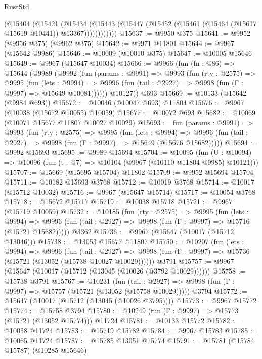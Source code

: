 \begin{lexlean}{RustStd}
\begin{coremodule}
{\begin{coremodule}
{{{{{{{{{{{{{{{{{{{{{{{{{{{{{{{{{{{{{{{{{{{{{{{{{{{{{{{{{{{{{{{{{{{{{{{{{{{{{{              (@15404
                (@15421
                  (@15434
                    (@15443
                      (@15447 (@15452 (@15461 (@15464 (@15617 @15619 @10441)) @13367))))))))))))
@15637 := @9950 @375
@15641 := @9952 (@9956 @375) (@9962 @375)
@15642 := @9971 @11801
@15644 := @9967 (@15642 @9986)
@15646 := @10009 (@10010 @375)
@15647 := @10005 @15646
@15649 := @9967 (@15647 @10034)
@15666 := @9966
    (fun (fn : @86) =>
    @15644
      (@9989
        (@9992
          (fun (params : @9991) =>
          @9993
            (fun (rty : @2575) =>
            @9995
              (fun (lets : @9994) =>
              @9996 (fun (tail : @2927) => @9998 (fun (Γ : @9997) => @15649 @10081))))))
        @10127))
    @693
@15669 := @10133 (@15642 (@9984 @693))
@15672 := @10046 (@10047 @693) @11804
@15676 := @9967 (@10038 (@15672 @10055) @10059)
@15677 := @10072 @693
@15682 := @10069 (@10071 @15677 @11807 @10027 @10029)
@15693 := fun (params : @9991) =>
  @9993
    (fun (rty : @2575) =>
    @9995
      (fun (lets : @9994) =>
      @9996 (fun (tail : @2927) => @9998 (fun (Γ : @9997) => @15649 (@15676 @15682)))))
@15694 := @9992 @15693
@15695 := @9989 @15694
@15704 := @10095
    (fun (U : @10094) => @10096 (fun (t : @7) => @10104 (@9967 (@10110 @11804 @9985) @10121)))
@15707 := @15669 (@15695 @15704) @11802
@15709 := @9952 @15694 @15704
@15711 := @10182 @15693 @3768
@15712 := @10019 @3768
@15714 := @10017 (@15712 @10032)
@15716 := @9967 (@15647 @15714)
@15717 := @10054 @3768
@15718 := @15672 @15717
@15719 := @10038 @15718
@15721 := @9967 (@15719 @10059)
@15732 := @10185
    (fun (rty : @2575) =>
    @9995
      (fun (lets : @9994) =>
      @9996 (fun (tail : @2927) => @9998 (fun (Γ : @9997) => @15716 (@15721 @15682)))))
    @3362
@15736 := @9967 (@15647 (@10017 (@15712 @13046)))
@15738 := @13053 @15677 @11807
@15750 := @10207
    (fun (lets : @9994) =>
    @9996
      (fun (tail : @2927) =>
      @9998 (fun (Γ : @9997) => @15736 (@15721 (@13052 (@15738 @10027 @10029))))))
    @3791
@15757 := @9967 (@15647 (@10017 (@15712 (@13045 (@10026 (@3792 @10029))))))
@15758 := @15738 @3791
@15767 := @10231
    (fun (tail : @2927) => @9998 (fun (Γ : @9997) => @15757 (@15721 (@13052 (@15758 @10029)))))
    @3794
@15772 := @15647 (@10017 (@15712 (@13045 (@10026 @3795))))
@15773 := @9967 @15772
@15774 := @15758 @3794
@15780 := @10249 (fun (Γ : @9997) => @15773 (@15721 (@13052 @15774))) @11724
@15781 := @10133 @15772
@15782 := @10058 @11724
@15783 := @15719 @15782
@15784 := @9967 @15783
@15785 := @10065 @11724
@15787 := @15785 @13051 @15774
@15791 := @15781 (@15784 @15787) (@10285 @15646)
}}}}}}}}}}}}}}}}}}}}}}}}}}}}}}}}}}}}}}}}}}}}}}}}}}}}}}}}}}}}}}}}}}}}}}}}}}}}}}
\end{coremodule}}
\end{coremodule}
\end{lexlean}

